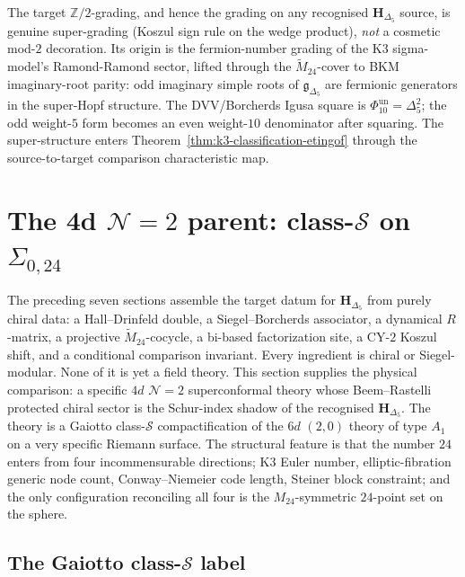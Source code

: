 \begin{remark}
\label{rem:super-genuine-fermion}
The target $\mathbb{Z}/2$-grading, and hence the grading on any recognised
$\mathbf{H}_{\Delta_5}$ source, is genuine super-grading (Koszul sign rule
on the wedge product), \emph{not} a cosmetic mod-$2$ decoration. Its
origin is the fermion-number grading of the K3 sigma-model's Ramond-Ramond sector,
lifted through the $\widetilde{M}_{24}$-cover to BKM imaginary-root parity: odd
imaginary simple roots of $\mathfrak{g}_{\Delta_5}$ are fermionic generators in the
super-Hopf structure. The DVV/Borcherds Igusa square is
\(\Phi_{10}^{\mathrm{un}}=\Delta_5^2\); the odd weight-$5$ form becomes an
even weight-$10$ denominator after squaring. The super-structure enters
Theorem~\ref{thm:k3-classification-etingof} through the source-to-target
comparison characteristic map.
\end{remark}

\section{The 4d \texorpdfstring{$\mathcal{N}=2$}{N=2} parent: class-\texorpdfstring{$\mathcal{S}$}{S} on \texorpdfstring{$\Sigma_{0,24}$}{Sigma-0,24}}
\label{sec:k3-classS-4d-parent}

The preceding seven sections assemble the target datum for
$\mathbf{H}_{\Delta_5}$ from purely chiral data: a Hall--Drinfeld double,
a Siegel--Borcherds associator, a dynamical $R$-matrix, a projective
$\widetilde{M}_{24}$-cocycle, a bi-based factorization site, a CY-$2$
Koszul shift, and a conditional comparison invariant. Every ingredient is
chiral or Siegel-modular. None of it is yet a field theory. This section
supplies the physical comparison: a specific $4d$ $\mathcal{N}=2$
superconformal theory whose Beem--Rastelli protected chiral sector is the
Schur-index shadow of the recognised $\mathbf{H}_{\Delta_5}$. The theory is a Gaiotto
class-$\mathcal{S}$ compactification of the $6d$ $(2,0)$ theory of type $A_1$
on a very specific Riemann surface. The structural feature is that the number $24$
enters from four incommensurable directions; K3 Euler number,
elliptic-fibration generic node count, Conway--Niemeier code length, Steiner
block constraint; and the only configuration reconciling all four is the
$M_{24}$-symmetric $24$-point set on the sphere.

\subsection{The Gaiotto class-\texorpdfstring{$\mathcal{S}$}{S} label}
\label{subsec:k3-classS-label}

